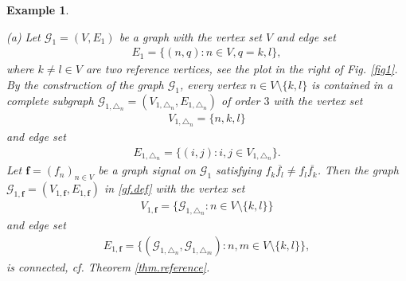 \documentclass[12pt,oneside,reqno]{amsart}
\newtheorem{example}[theorem]{Example}%
\newcommand{\Z}{\mathbb{Z}}
\numberwithin{equation}{section}
\begin{document}
	
	\begin{example}\label{rem2}{\rm
			(a)  Let ${\mathcal G}_1=(V, E_1)$ be a graph   with the vertex set $V$ and edge set
			\begin{align*}
				E_1=\{(n,q):n\in V, q=k,l \}, 
			\end{align*}
			where $k\ne l\in V$ are two reference vertices, see  the plot in the right of Fig. \ref{fig1}.  By the construction of the graph ${\mathcal G}_1$,  every vertex $n\in V\setminus \{k, l\}$ is contained in a  complete subgraph  $\mathcal{G}_{1,\triangle_n} = (V_{1,\triangle_n}, E_{1,\triangle_n})$ of order $3$  with the vertex set
			\begin{align*}
				V_{1,\triangle_n} = \{n, k, l \}
			\end{align*}
			and edge set
			\begin{align*}
				E_{1,\triangle_n} = \{(i,j): i,j \in V_{1,\triangle_n}\}.
			\end{align*}
			Let $\mathbf{f}=(f_n)_{n\in V}$ be a graph signal on ${\mathcal G}_1$ satisfying $ f_k\overline{f_l}\ne f_l\overline{f_k}$. Then  the graph $\mathcal{G}_{1,\mathbf{f}} = (V_{1,\mathbf{f}}, E_{1,\mathbf{f}})$ in \eqref{gf.def} with the vertex set
			\begin{align*}
				V_{1,\mathbf{f}} = \{\mathcal{G}_{1,\triangle_n}: n\in V\setminus \{k,l\} \}
			\end{align*}
			and edge set
			\begin{align*}
				E_{1,\mathbf{f}} = \{(\mathcal{G}_{1,\triangle_n}, \mathcal{G}_{1,\triangle_{m}}): n, m\in V\setminus \{k,l\} \},
			\end{align*}
			is connected, cf. Theorem \ref{thm.reference}.  %
		
}
\end{example}
\end{document}
